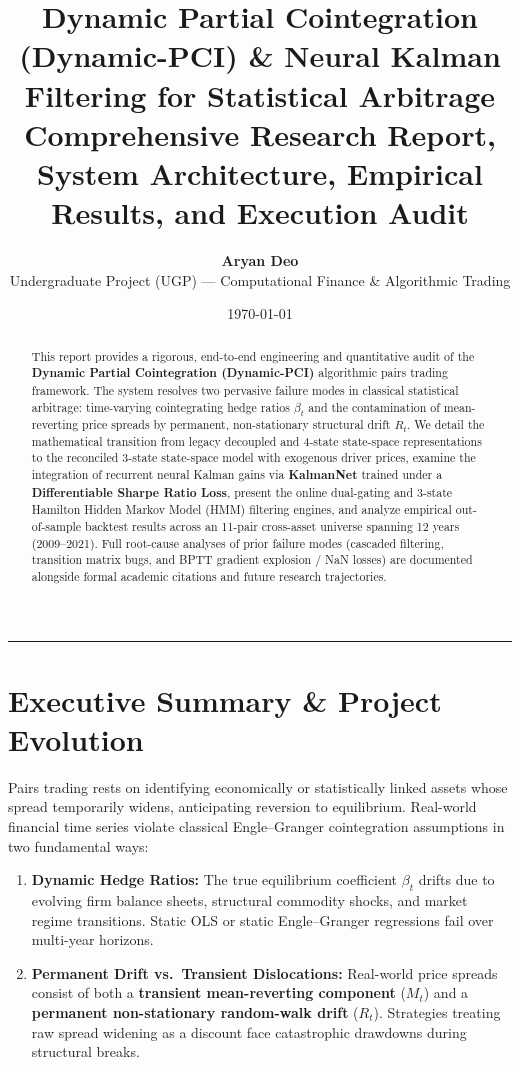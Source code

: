 \documentclass[11pt, a4paper]{article}
\title{\textbf{\Large Dynamic Partial Cointegration (Dynamic-PCI) \& Neural Kalman Filtering for Statistical Arbitrage}\\[0.4em]
\large Comprehensive Research Report, System Architecture, Empirical Results, and Execution Audit}
\author{\textbf{Aryan Deo}\\
\small Undergraduate Project (UGP) --- Computational Finance \& Algorithmic Trading}
\date{\today}
\begin{document}
\maketitle

\begin{abstract}
This report provides a rigorous, end-to-end engineering and quantitative audit of the \textbf{Dynamic Partial Cointegration (Dynamic-PCI)} algorithmic pairs trading framework. The system resolves two pervasive failure modes in classical statistical arbitrage: time-varying cointegrating hedge ratios $\beta_t$ and the contamination of mean-reverting price spreads by permanent, non-stationary structural drift $R_t$. We detail the mathematical transition from legacy decoupled and 4-state state-space representations to the reconciled 3-state state-space model with exogenous driver prices, examine the integration of recurrent neural Kalman gains via \textbf{KalmanNet} trained under a \textbf{Differentiable Sharpe Ratio Loss}, present the online dual-gating and 3-state Hamilton Hidden Markov Model (HMM) filtering engines, and analyze empirical out-of-sample backtest results across an 11-pair cross-asset universe spanning 12 years (2009--2021). Full root-cause analyses of prior failure modes (cascaded filtering, transition matrix bugs, and BPTT gradient explosion / NaN losses) are documented alongside formal academic citations and future research trajectories.
\end{abstract}

\tableofcontents
\vspace{1.5em}
\hrule
\vspace{1.5em}

\section{Executive Summary \& Project Evolution}

Pairs trading rests on identifying economically or statistically linked assets whose spread temporarily widens, anticipating reversion to equilibrium. Real-world financial time series violate classical Engle--Granger cointegration assumptions in two fundamental ways:
\begin{enumerate}
    \item \textbf{Dynamic Hedge Ratios:} The true equilibrium coefficient $\beta_t$ drifts due to evolving firm balance sheets, structural commodity shocks, and market regime transitions. Static OLS or static Engle--Granger regressions fail over multi-year horizons.
    \item \textbf{Permanent Drift vs.\ Transient Dislocations:} Real-world price spreads consist of both a \textbf{transient mean-reverting component} ($M_t$) and a \textbf{permanent non-stationary random-walk drift} ($R_t$). Strategies treating raw spread widening as a discount face catastrophic drawdowns during structural breaks.
\end{enumerate}
\end{document}
